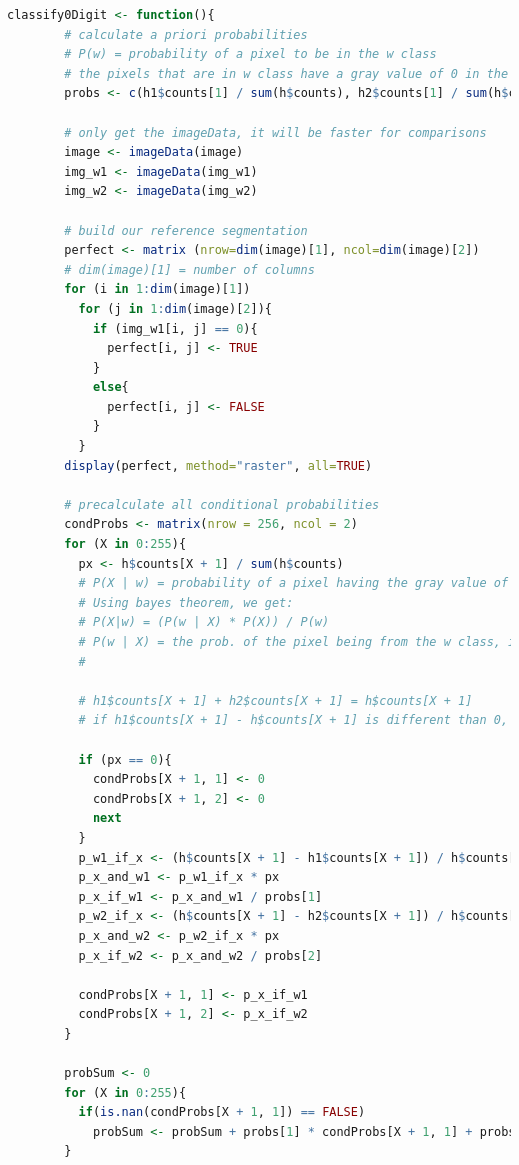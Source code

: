 \begin{lstlisting}[language=R, caption=Automatic segmentation for digit 0]
    classify0Digit <- function(){
        # calculate a priori probabilities
        # P(w) = probability of a pixel to be in the w class
        # the pixels that are in w class have a gray value of 0 in the image corresponding to w
        probs <- c(h1$counts[1] / sum(h$counts), h2$counts[1] / sum(h$counts))
        
        # only get the imageData, it will be faster for comparisons
        image <- imageData(image)
        img_w1 <- imageData(img_w1)
        img_w2 <- imageData(img_w2)
        
        # build our reference segmentation
        perfect <- matrix (nrow=dim(image)[1], ncol=dim(image)[2])
        # dim(image)[1] = number of columns
        for (i in 1:dim(image)[1])
          for (j in 1:dim(image)[2]){
            if (img_w1[i, j] == 0){
              perfect[i, j] <- TRUE
            }
            else{
              perfect[i, j] <- FALSE
            }
          }
        display(perfect, method="raster", all=TRUE)
        
        # precalculate all conditional probabilities
        condProbs <- matrix(nrow = 256, ncol = 2)
        for (X in 0:255){
          px <- h$counts[X + 1] / sum(h$counts)
          # P(X | w) = probability of a pixel having the gray value of X if the pixel is from class w
          # Using bayes theorem, we get:
          # P(X|w) = (P(w | X) * P(X)) / P(w)
          # P(w | X) = the prob. of the pixel being from the w class, if its value is X
          # 
          
          # h1$counts[X + 1] + h2$counts[X + 1] = h$counts[X + 1]
          # if h1$counts[X + 1] - h$counts[X + 1] is different than 0, then those pixels were NOT assigned to w1
          
          if (px == 0){
            condProbs[X + 1, 1] <- 0
            condProbs[X + 1, 2] <- 0
            next
          }
          p_w1_if_x <- (h$counts[X + 1] - h1$counts[X + 1]) / h$counts[X + 1]
          p_x_and_w1 <- p_w1_if_x * px
          p_x_if_w1 <- p_x_and_w1 / probs[1]
          p_w2_if_x <- (h$counts[X + 1] - h2$counts[X + 1]) / h$counts[X + 1]
          p_x_and_w2 <- p_w2_if_x * px
          p_x_if_w2 <- p_x_and_w2 / probs[2]
          
          condProbs[X + 1, 1] <- p_x_if_w1
          condProbs[X + 1, 2] <- p_x_if_w2
        }
        
        probSum <- 0
        for (X in 0:255){
          if(is.nan(condProbs[X + 1, 1]) == FALSE)
            probSum <- probSum + probs[1] * condProbs[X + 1, 1] + probs[2] * condProbs[X + 1, 2]
        }
        

\end{lstlisting}

